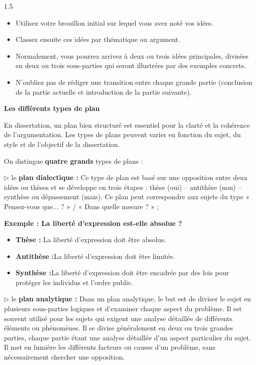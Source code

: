 \documentclass[12pt]{article}
\begin{document}
\begin{spacing}{1.5}
\begin{itemize}
\item Utilisez votre brouillon initial sur lequel vous avez noté vos idées.
\item Classez ensuite ces idées par thématique ou argument.
\item Normalement, vous pourrez arrivez à deux ou trois idées principales, divisées en deux ou trois sous-parties qui seront illustrées par des exemples concrets.
\item N'oubliez pas de rédiger une transition entre chaque grande partie (conclusion de la partie actuelle et introduction de la partie suivante).
\end{itemize}

\vspace*{1.5cm}

\textbf{Les différents types de plan}

En dissertation, un plan bien structuré est essentiel pour la clarté et la cohérence de l'argumentation. Les types de plans peuvent varier en fonction du sujet, du style et de l'objectif de la dissertation.
 
On distingue \textbf{ quatre grands} types de plans : 
 
 $\rhd$ le \textbf{plan dialectique :} Ce type de plan est basé sur une opposition entre deux idées ou thèses et se développe en trois étapes : thèse (oui) – antithèse (non) – synthèse ou dépassement (mais). Ce plan peut correspondre aux sujets du type « Pensez-vous que... ? » / « Dans quelle mesure ? » ; 

\textbf{Exemple : La liberté d'expression est-elle absolue ?}

\begin{itemize}
\item \textbf{Thèse :} La liberté d'expression doit être absolue.
\item \textbf{ Antithèse :}La liberté d'expression doit être limitée.
\item \textbf{ Synthèse :}La liberté d'expression doit être encadrée par des lois pour protéger les individus et l'ordre public.\end{itemize}




$\rhd$ le \textbf{plan analytique :} Dans un plan analytique, le but est de diviser le sujet en plusieurs sous-parties logiques et d'examiner chaque aspect du problème. Il est souvent utilisé pour les sujets qui exigent une analyse détaillée de différents éléments ou phénomènes. Il se divise généralement en deux ou trois grandes parties, chaque partie étant une analyse détaillée d'un aspect particulier du sujet.
Il met en lumière les différents facteurs ou causes d'un problème, sans nécessairement chercher une opposition.


\end{spacing}
\end{document}
